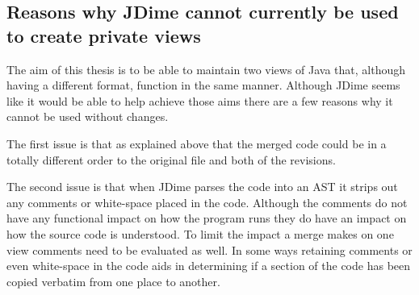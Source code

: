 \subsection{Reasons why JDime cannot currently be used to create private views}
The aim of this thesis is to be able to maintain two views of Java that, although having a different format, function in the same manner.  Although JDime seems like it would be able to help achieve those aims there are a few reasons why it cannot be used without changes.

The first issue is that as explained above that the merged code could be in a totally different order to the original file and both of the revisions.

The second issue is that when JDime parses the code into an AST it strips out any comments or white-space placed in the code.  Although the comments do not have any functional impact on how the program runs they do have an impact on how the source code is understood.  To limit the impact a merge makes on one view comments need to be evaluated as well. In some ways retaining comments or even white-space in the code aids in determining if a section of the code has been copied verbatim from one place to another.


% 
% 
% 


